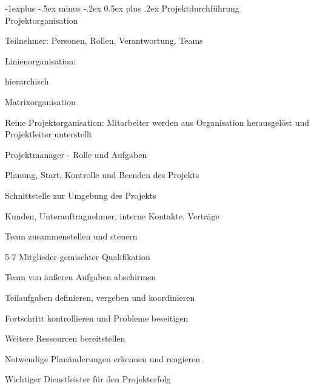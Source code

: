 \documentclass[a4paper]{article}
\makeatletter
\renewcommand{\subsection}{\@startsection{subsection}{2}{0mm}%
                                {-1explus -.5ex minus -.2ex}%
                                {0.5ex plus .2ex}%
                                {\normalfont\normalsize\bfseries}}
\makeatother
\begin{document}
\begin{multicols}{3}
  \subsection{Projektdurchführung}
  Projektorganisation
  \begin{itemize*}
    \item Teilnehmer: Personen, Rollen, Verantwortung, Teams
    \item Linienorganisation:
          \begin{itemize*}
            \item hierarchisch %
            \item Matrixorganisation %
            \item Reine Projektorganisation: Mitarbeiter werden aus Organisation herausgelöst und Projektleiter unterstellt
          \end{itemize*}
  \end{itemize*}

  Projektmanager - Rolle und Aufgaben
  \begin{itemize*}
    \item Planung, Start, Kontrolle und Beenden des Projekts
    \item Schnittstelle zur Umgebung des Projekts
          \begin{itemize*}
            \item Kunden, Unterauftragnehmer, interne Kontakte, Verträge
          \end{itemize*}
    \item Team zusammenstellen und steuern
          \begin{itemize*}
            \item 5-7 Mitglieder gemischter Qualifikation
            \item Team von äußeren Aufgaben abschirmen
            \item Teilaufgaben definieren, vergeben und koordinieren
            \item Fortschritt kontrollieren und Probleme beseitigen
          \end{itemize*}
    \item Weitere Ressourcen bereitstellen
    \item Notwendige Planänderungen erkennen und reagieren
    \item Wichtiger Dienstleister für den Projekterfolg
  \end{itemize*}


\end{multicols}
\end{document}
